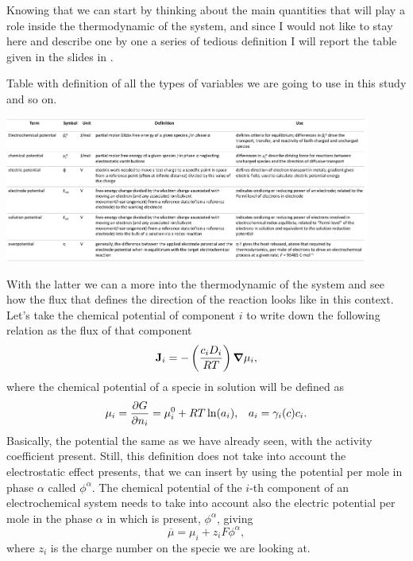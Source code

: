 Knowing that we can start by thinking about the main quantities that will play a role inside the thermodynamic of the system, and since I would not like to stay here and describe one by one a series of tedious definition I will report the table given in the slides in .
\begin{table}[t]
    \caption{
        Table with definition of all the types of variables we are going to use in this study and so on.
    }
    \label{tab:Def}
    \centering
    \includegraphics[width=0.9\textwidth]{Immagini/TabDef.png}
\end{table}
With the latter we can a more into the thermodynamic of the system and see how the flux that defines the direction of the reaction looks like in this context. Let's take the chemical potential of component $i$ to write down the following relation as the flux of that component
\begin{equation}
    \vb{J}_i = -\left( \frac{c_iD_i}{RT} \right)\grad \mu_i,
\end{equation}
where the chemical potential of a specie in solution will be defined as
\begin{align}
    &\mu_i = \pdv{G}{n_i} = \mu^0_i + RT\ln(a_i), &a_i = \gamma_i(c) c_i.
\end{align}
Basically, the potential the same as we have already seen, with the activity coefficient present. Still, this definition does not take into account the electrostatic effect presents, that we can insert by using the potential per mole in phase $\alpha$ called $\phi^\alpha$. 
{
    The chemical potential of the $i$-th component of an electrochemical system needs to take into account also the electric potential per mole in the phase $\alpha$ in which is present, $\phi^\alpha$, giving
    \begin{equation}
        \label{eq:ElecPotDef}
        \overline{\mu} = \mu_i + z_i F \phi^\alpha,
    \end{equation}
    where $z_i$ is the charge number on the specie we are looking at.
}
\noindent
